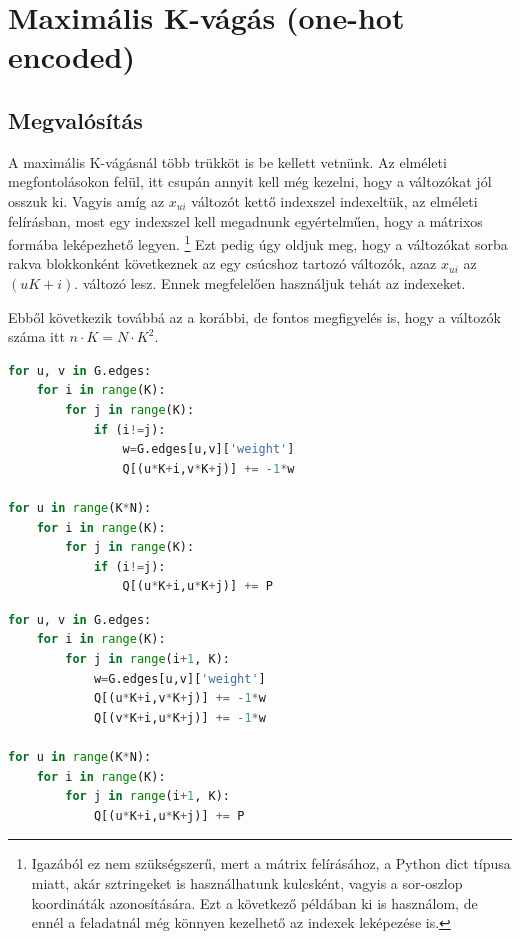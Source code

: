 \section{Maximális K-vágás (one-hot encoded)}\label{sec:practiceOneHot}

\subsection{Megvalósítás}

A maximális K-vágásnál több trükköt is be kellett vetnünk. Az elméleti megfontolásokon felül, itt csupán annyit kell még kezelni, hogy a változókat jól osszuk ki. Vagyis amíg az $x_{ui}$ változót kettő indexszel indexeltük, az elméleti felírásban, most egy indexszel kell megadnunk egyértelműen, hogy a mátrixos formába leképezhető legyen.
\footnote{Igazából ez nem szükségszerű, mert a mátrix felírásához, a Python dict típusa miatt, akár sztringeket is használhatunk kulcsként, vagyis a sor-oszlop koordináták azonosítására. Ezt a következő példában ki is használom, de ennél a feladatnál még könnyen kezelhető az indexek leképezése is.}
Ezt pedig úgy oldjuk meg, hogy a változókat sorba rakva blokkonként következnek az egy csúcshoz tartozó változók, azaz $x_{ui}$ az $(uK+i)$. változó lesz. Ennek megfelelően használjuk tehát az indexeket.

Ebből következik továbbá az a korábbi, de fontos megfigyelés is, hogy a változók száma itt $n \cdot K = N \cdot K^2$.

\begin{lstlisting}[language=python,caption=Maximális K-vágás QUBO (szimmetrikus mátrix), label=code:maxKCutQUBOSymmetric]
for u, v in G.edges:
	for i in range(K):
		for j in range(K):
			if (i!=j):
				w=G.edges[u,v]['weight']
				Q[(u*K+i,v*K+j)] += -1*w

for u in range(K*N):
	for i in range(K):
		for j in range(K):
			if (i!=j):
				Q[(u*K+i,u*K+j)] += P 
\end{lstlisting}

\begin{lstlisting}[language=python,caption=Maximális K-vágás QUBO (háromszög mátrix),label=code:maxKCutQUBOTriangle]
for u, v in G.edges:
	for i in range(K):
		for j in range(i+1, K):
			w=G.edges[u,v]['weight']
			Q[(u*K+i,v*K+j)] += -1*w
			Q[(v*K+i,u*K+j)] += -1*w

for u in range(K*N):
	for i in range(K):
		for j in range(i+1, K):
			Q[(u*K+i,u*K+j)] += P
\end{lstlisting}


